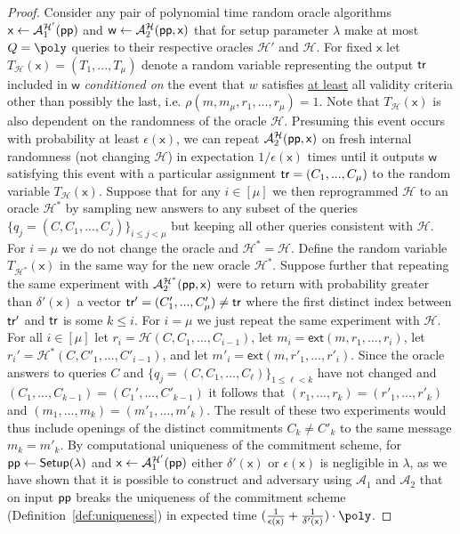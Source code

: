 \begin{proof} 
Consider any pair of polynomial time random oracle algorithms $\mathsf{x} \gets \mathcal{A}_1^{\mathcal{H}'}(\textsf{pp})$ 
and $\mathsf{w} \gets \mathcal{A}_2^{\mathcal{H}}(\textsf{pp}, \mathsf{x})$ that for setup parameter $\lambda$ make at most $Q = \poly$ queries to their respective oracles $\mathcal{H}'$ and $\mathcal{H}$. For fixed $\mathsf{x}$ let $T_\mathcal{H}(\mathsf{x}) = (T_1,...,T_\mu)$ denote a random variable representing the output $\textsf{{tr}}$ included in $\mathsf{w}$ \emph{conditioned on} the event that $w$ satisfies \underline{at least} all validity criteria other than possibly the last, i.e. $\rho(m, m_\mu, r_1,...,r_\mu) = 1$. Note that $T_\mathcal{H}(\mathsf{x})$ is also dependent on the randomness of the oracle $\mathcal{H}$. 
Presuming this event occurs with probability at least $\epsilon(\mathsf{x})$, we can repeat $\mathcal{A}_2^\mathcal{H}(\textsf{pp}, \mathsf{x})$ on fresh internal randomness (not changing $\mathcal{H}$) in expectation $1/\epsilon(\mathsf{x})$ times until it outputs $\mathsf{w}$ satisfying this event with a particular assignment $\textsf{{tr}} = (C_1,...,C_\mu)$ to the random variable $T_\mathcal{H}(\mathsf{x})$. Suppose that for any $i \in [\mu]$ we then reprogrammed $\mathcal{H}$ to an oracle $\mathcal{H}^*$ by sampling new answers to any subset of the queries $\{q_j = (C, C_1,...,C_j)\}_{i \leq j < \mu}$ but keeping all other queries consistent with $\mathcal{H}$.  For $i = \mu$ we do not change the oracle and $\mathcal{H}^* = \mathcal{H}$. Define the random variable $T_\mathcal{H^*}(\mathsf{x})$ in the same way for the new oracle $\mathcal{H}^*$. 
Suppose further that repeating the same experiment with $\mathcal{A}_2^\mathcal{H^*}(\textsf{pp}, \mathsf{x})$ were to return with probability greater than $\delta'(\mathsf{x})$ a vector $\textsf{{tr}}'= (C_1',...,C'_\mu) \neq \textsf{{tr}}$ where the first distinct index between $\textsf{{tr}}'$ and $\textsf{{tr}}$ is some $k \leq i$. 
For $i = \mu$ we just repeat the same experiment with $\mathcal{H}$. For all $i \in [\mu]$ let $r_i = \mathcal{H}(C, C_1,...,C_{i-1})$, let $m_i = \textsf{ext}(m, r_1,...,r_i)$, let $r_i' = \mathcal{H}^*(C, C'_1,...,C'_{i-1})$, and let $m'_i = \textsf{ext}(m, r'_1,...,r'_i)$. Since the oracle answers to queries $C$ and $\{q_j = (C, C_1,...,C_\ell)\}_{1 \leq \ell < k}$ have not changed and $(C_1,...,C_{k-1}) = (C_1',...,C'_{k-1})$ it follows that $(r_1,...,r_k) = (r'_1,...,r'_k)$ and $(m_1,...,m_k) = (m'_1,...,m'_k)$. The result of these two experiments would thus include openings of the distinct commitments $C_k \neq C'_k$ to the same message $m_k = m'_k$. 
By computational uniqueness of the commitment scheme, for $\textsf{pp} \gets \textsf{{Setup}}(\lambda)$ and $\mathsf{x} \gets \mathcal{A}_1^{\mathcal{H}'}(\textsf{pp})$ 
either $\delta'(\mathsf{x})$ or $\epsilon(\mathsf{x})$ is negligible in $\lambda$, as we have shown that it is possible to construct and adversary using $\mathcal{A}_1$ and $\mathcal{A}_2$ that on input $\textsf{pp}$ breaks the uniqueness of the commitment scheme (Definition~\ref{def:uniqueness})
in expected time $(\frac{1}{\epsilon(\mathsf{x})} + \frac{1}{\delta'(\mathsf{x})}) \cdot \mathsf{\poly}$.
 


\end{proof}
